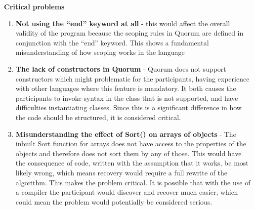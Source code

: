 \textbf{Critical problems}
\begin{enumerate}
\item \textbf{Not using the “end” keyword at all} - this would affect the overall validity of the program because the scoping rules in Quorum are defined in conjunction with the “end” keyword. This shows a fundamental misunderstanding of how scoping works in the language
\item \textbf{The lack of constructors in Quorum} - Quorum does not support constructors which might problematic for the participants, having experience with other languages where this feature is mandatory. It both causes the participants to invoke syntax in the class that is not supported, and have difficulties instantiating classes. Since this is a significant difference in how the code should be structured, it is considered critical.
\item \textbf{Misunderstanding the effect of Sort() on arrays of objects} - The inbuilt Sort function for arrays does not have access to the properties of the objects and therefore does not sort them by any of those. This would have the consequence of code, written with the assumption that it works, be most likely wrong, which means recovery would require a full rewrite of the algorithm. This makes the problem critical. It is possible that with the use of a compiler the participant would discover and recover much easier, which could mean the problem would potentially be considered serious.
\end{enumerate}

